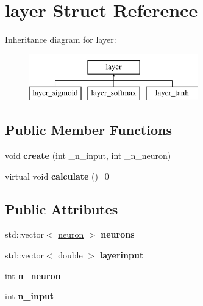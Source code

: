 \hypertarget{structlayer}{\section{layer Struct Reference}
\label{structlayer}
}
Inheritance diagram for layer\-:\begin{figure}[H]
\begin{center}
\leavevmode
\includegraphics[height=2.000000cm]{structlayer}
\end{center}
\end{figure}
\subsection*{Public Member Functions}
\begin{DoxyCompactItemize}
\item 
\hypertarget{structlayer_a50ca540d57f99add95b7e92c96498810}{void {\bfseries create} (int \-\_\-n\-\_\-input, int \-\_\-n\-\_\-neuron)}\label{structlayer_a50ca540d57f99add95b7e92c96498810}

\item 
\hypertarget{structlayer_aacf7297d77c1ea2933d5551636f7c9ad}{virtual void {\bfseries calculate} ()=0}\label{structlayer_aacf7297d77c1ea2933d5551636f7c9ad}

\end{DoxyCompactItemize}
\subsection*{Public Attributes}
\begin{DoxyCompactItemize}
\item 
\hypertarget{structlayer_a370f3ea69cfa52d599d8bb107276122d}{std\-::vector$<$ \hyperlink{structneuron}{neuron} $>$ {\bfseries neurons}}\label{structlayer_a370f3ea69cfa52d599d8bb107276122d}

\item 
\hypertarget{structlayer_aefd4997e805a4f4c3db2b5415104d215}{std\-::vector$<$ double $>$ {\bfseries layerinput}}\label{structlayer_aefd4997e805a4f4c3db2b5415104d215}

\item 
\hypertarget{structlayer_a17b545f98fb35b4b856e3e0c8d9a0876}{int {\bfseries n\-\_\-neuron}}\label{structlayer_a17b545f98fb35b4b856e3e0c8d9a0876}

\item 
\hypertarget{structlayer_a8323a6ef4cab8f81515ca964b79034fe}{int {\bfseries n\-\_\-input}}\label{structlayer_a8323a6ef4cab8f81515ca964b79034fe}

\end{DoxyCompactItemize}


